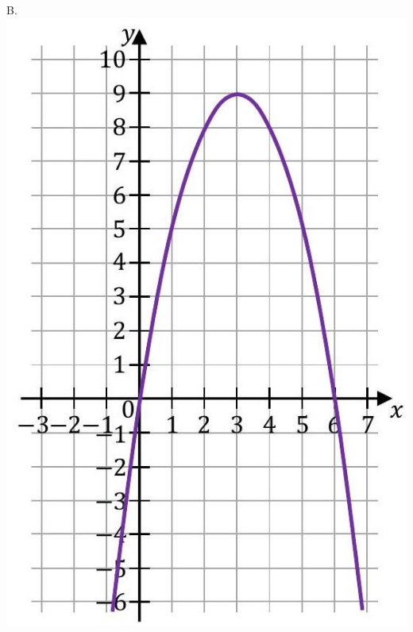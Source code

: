 \documentclass[10pt]{article}
\begin{document}
B.\\
\includegraphics[max width=\textwidth, center]{2024_11_21_daeb5e5efb43dd4cb535g-14(2)}\\
\end{document}
